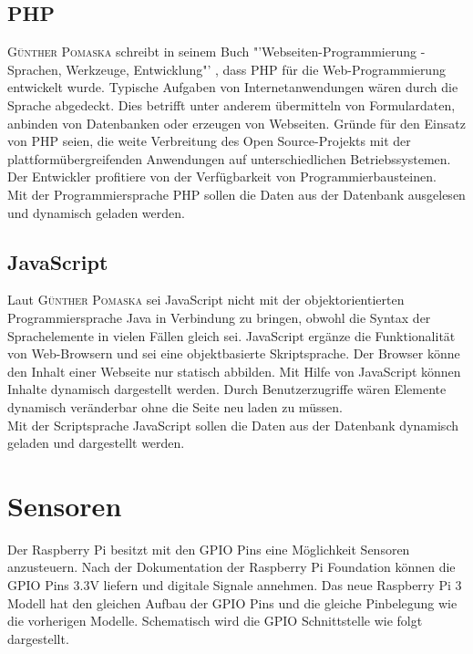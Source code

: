 \subsection{\acf{PHP}}\label{PHP}
\textsc{Günther Pomaska} schreibt in seinem Buch "'Webseiten-Programmierung - Sprachen, Werkzeuge, Entwicklung"' \cite{pomaska2012webseiten-programmierung}, dass \ac{PHP} für die Web-Programmierung entwickelt wurde. Typische Aufgaben von Internetanwendungen wären durch die Sprache abgedeckt. Dies betrifft unter anderem übermitteln von Formulardaten, anbinden von Datenbanken oder erzeugen von Webseiten. Gründe für den Einsatz von \ac{PHP} seien, die weite Verbreitung des Open Source-Projekts mit der plattformübergreifenden Anwendungen auf unterschiedlichen Betriebssystemen. Der Entwickler profitiere von der Verfügbarkeit von Programmierbausteinen.\\
Mit der Programmiersprache \ac{PHP} sollen die Daten aus der Datenbank ausgelesen und dynamisch geladen werden.

\subsection{JavaScript}
Laut \textsc{Günther Pomaska} \cite{pomaska2012webseiten-programmierung} sei JavaScript nicht mit der objektorientierten Programmiersprache Java in Verbindung zu bringen, obwohl die Syntax der Sprachelemente in vielen Fällen gleich sei. JavaScript ergänze die Funktionalität von Web-Browsern und sei eine objektbasierte Skriptsprache. Der Browser könne den Inhalt einer Webseite nur statisch abbilden. Mit Hilfe von JavaScript können Inhalte dynamisch dargestellt werden. Durch Benutzerzugriffe wären Elemente dynamisch veränderbar ohne die Seite neu laden zu müssen.\\
Mit der Scriptsprache JavaScript sollen die Daten aus der Datenbank dynamisch geladen und dargestellt werden.

\section{Sensoren}\label{Sensoren_Planung}
Der Raspberry Pi besitzt mit den \ac{GPIO} Pins eine Möglichkeit Sensoren anzusteuern. Nach der Dokumentation der Raspberry Pi Foundation\cite{GPIOMode77:online} können die \ac{GPIO} Pins 3.3V liefern und digitale Signale annehmen. Das neue Raspberry Pi 3 Modell hat den gleichen Aufbau der \ac{GPIO} Pins und die gleiche Pinbelegung wie die vorherigen Modelle. Schematisch wird die \ac{GPIO} Schnittstelle wie folgt dargestellt.\\

